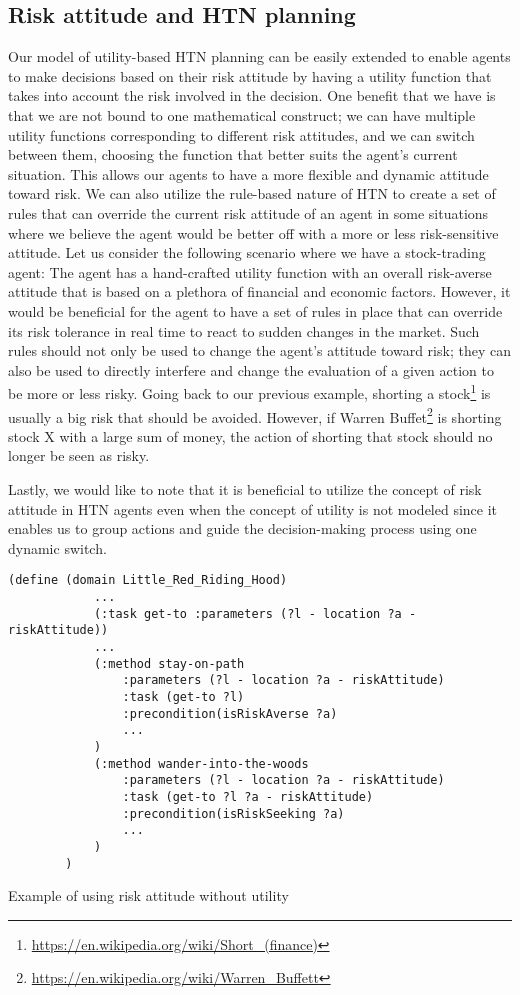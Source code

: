 \subsection{Risk attitude and HTN planning}
Our model of utility-based HTN planning can be easily extended to enable agents to make decisions based on their risk attitude by having a utility function that takes into account the risk involved in the decision. One benefit that we have is that we are not bound to one mathematical construct; we can have multiple utility functions corresponding to different risk attitudes, and we can switch between them, choosing the function that better suits the agent's current situation. This allows our agents to have a more flexible and dynamic attitude toward risk. We can also utilize the rule-based nature of HTN to create a set of rules that can override the current risk attitude of an agent in some situations where we believe the agent would be better off with a more or less risk-sensitive attitude. Let us consider the following scenario where we have a stock-trading agent: The agent has a hand-crafted utility function with an overall risk-averse attitude that is based on a plethora of financial and economic factors. However, it would be beneficial for the agent to have a set of rules in place that can override its risk tolerance in real time to react to sudden changes in the market. Such rules should not only be used to change the agent's attitude toward risk; they can also be used to directly interfere and change the evaluation of a given action to be more or less risky. Going back to our previous example, shorting a stock\footnote{\url{https://en.wikipedia.org/wiki/Short_(finance)}} is usually a big risk that should be avoided. However, if Warren Buffet\footnote{\url{https://en.wikipedia.org/wiki/Warren_Buffett}} is shorting stock X with a large sum of money, the action of shorting that stock should no longer be seen as risky.

Lastly, we would like to note that it is beneficial to utilize the concept of risk attitude in HTN agents even when the concept of utility is not modeled since it enables us to group actions and guide the decision-making process using one dynamic switch.

\begin{Listing}
    \begin{lstlisting}[language=HDDL]
        (define (domain Little_Red_Riding_Hood)
            ...
            (:task get-to :parameters (?l - location ?a - riskAttitude))
            ...
            (:method stay-on-path
                :parameters (?l - location ?a - riskAttitude)
                :task (get-to ?l)
                :precondition(isRiskAverse ?a)
                ...
            )
            (:method wander-into-the-woods
                :parameters (?l - location ?a - riskAttitude)
                :task (get-to ?l ?a - riskAttitude)
                :precondition(isRiskSeeking ?a)
                ...
            )
        )
    \end{lstlisting}
    \caption{Example of using risk attitude without utility}
    \label{lst:risk-without-utility}
\end{Listing}

